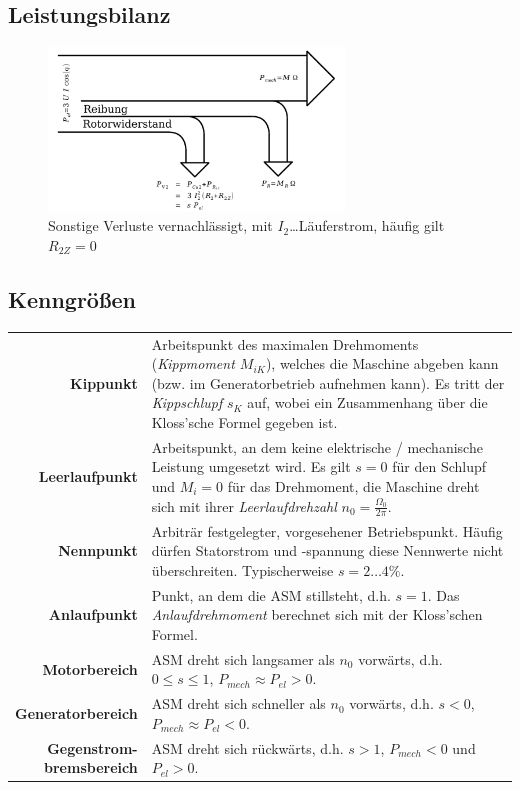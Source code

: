 \documentclass[11pt]{article}
\begin{document}
\subsection*{Leistungsbilanz}
\begin{figure}[h]
	\centering
	\includegraphics[width=0.7\textwidth]{img/asynchronmaschine_leistungsbilanz.pdf}
	\caption*{Sonstige Verluste vernachlässigt, mit $I_2$…Läuferstrom, häufig gilt $R_{2Z} = 0$}
\end{figure}

\subsection*{Kenngrößen}
\begin{center}
\bgroup
\begin{longtable}{r p{12cm}}
	\textbf{Kippunkt} & Arbeitspunkt des maximalen Drehmoments (\textit{Kippmoment $M_{iK}$}), welches die Maschine abgeben kann (bzw. im Generatorbetrieb aufnehmen kann). Es tritt der \textit{Kippschlupf} $s_K$ auf, wobei ein Zusammenhang über die Kloss'sche Formel gegeben ist. \\
	\textbf{Leerlaufpunkt} & Arbeitspunkt, an dem keine elektrische / mechanische Leistung umgesetzt wird. Es gilt $s = 0$ für den Schlupf und $M_i = 0$ für das Drehmoment, die Maschine dreht sich mit ihrer \textit{Leerlaufdrehzahl} $n_0 = \frac{\Omega_0}{2\pi}$. \\
	\textbf{Nennpunkt} & Arbiträr festgelegter, vorgesehener Betriebspunkt. Häufig dürfen Statorstrom und -spannung diese Nennwerte nicht überschreiten. Typischerweise $s = 2\dots4\%$. \\
	\textbf{Anlaufpunkt} & Punkt, an dem die ASM stillsteht, d.h. $s = 1$. Das \textit{Anlaufdrehmoment} berechnet sich mit der Kloss'schen Formel. \\
	\textbf{Motorbereich} & ASM dreht sich langsamer als $n_0$ vorwärts, d.h. $0 \leq s \leq 1$, $P_{mech} \approx P_{el} > 0$. \\
	\textbf{Generatorbereich} & ASM dreht sich schneller als $n_0$ vorwärts, d.h. $s < 0$, $P_{mech} \approx P_{el} < 0$. \\
	\pbox{20cm}{\textbf{Gegenstrom-} \\ \textbf{bremsbereich}} & ASM dreht sich rückwärts, d.h. $s > 1$, $P_{mech} < 0$ und $P_{el} > 0$.
\end{longtable}
\egroup
\end{center}
\end{document}
